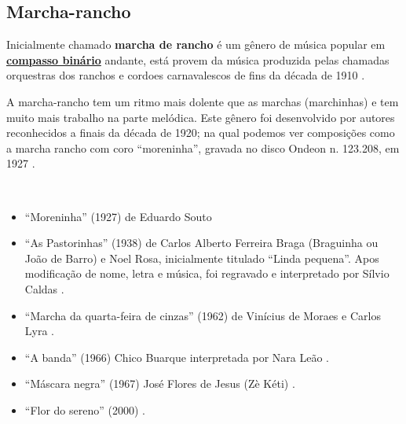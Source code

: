 \subsection{Marcha-rancho}
Inicialmente chamado \textbf{marcha de rancho} \cite[pp. 448]{marcondes1977enciclopedia}
é um gênero de música popular em \hyperref[subsec:compassobinario]{\textbf{compasso binário}} andante, 
está provem da música produzida pelas chamadas orquestras dos ranchos e cordoes 
carnavalescos de fins da década de 1910 \cite[pp. 65]{reinato2010musica} \cite[pp. 448]{marcondes1977enciclopedia}.

A marcha-rancho tem um ritmo mais dolente que as marchas (marchinhas)
e tem muito mais trabalho na parte melódica. 
Este gênero foi desenvolvido por autores reconhecidos
a finais da década de 1920;
na qual podemos ver composições como a marcha rancho com coro ``moreninha'',
gravada no disco Ondeon n. 123.208, em 1927 \cite[pp. 448]{marcondes1977enciclopedia}.

\begin{example} ~

\begin{itemize}
\item ``Moreninha'' (1927) de Eduardo Souto \cite[pp. 448]{marcondes1977enciclopedia}
\item ``As Pastorinhas'' (1938) de Carlos Alberto Ferreira Braga (Braguinha ou João de Barro) e Noel Rosa, 
inicialmente titulado ``Linda pequena''.
Apos modificação de nome, letra e música, 
foi regravado e interpretado por Sílvio Caldas \cite[pp. 1066]{marcondes1977enciclopediav2} \cite[pp. 87]{diniz2008almanaque}.
\item ``Marcha da quarta-feira de cinzas'' (1962) de Vinícius de Moraes e Carlos Lyra \cite[pp. 1021]{marcondes1977enciclopediav2} \cite[pp. 91]{diniz2008almanaque}.
\item ``A banda'' (1966) Chico Buarque interpretada por Nara Leão \cite[pp. 90]{diniz2008almanaque} \cite{partituraabanda1}.
\item ``Máscara negra'' (1967) José Flores de Jesus (Zè Kéti)  \cite[pp. 89]{diniz2008almanaque}.
\item ``Flor do sereno'' (2000)  \cite[pp. 88]{diniz2008almanaque}.

\end{itemize}
\end{example}

